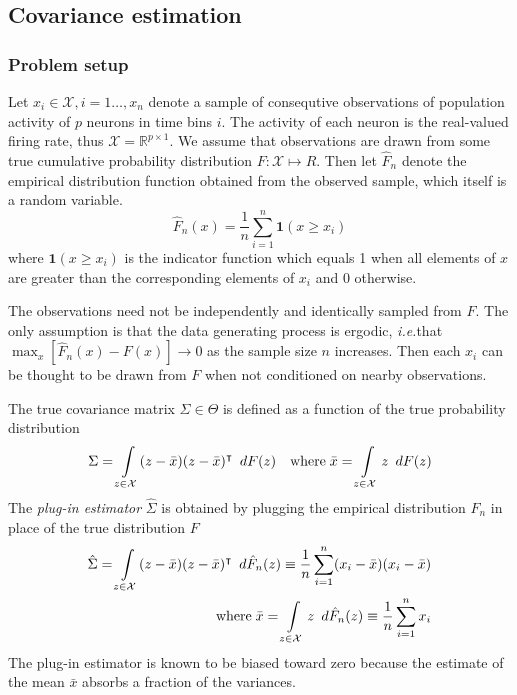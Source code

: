 \subsection{Covariance estimation}

\subsubsection{Problem setup}

Let $x_i \in \mathcal X, i=1\ldots,x_n$ denote a sample of consequtive observations of population activity of $p$ neurons in time bins $i$.  
The activity of each neuron is the real-valued firing rate, thus  $\mathcal X = \mathbb R^{p\times 1}$.  
We assume that observations are drawn from some true cumulative probability distribution $F: \mathcal X \mapsto R$. Then let $\hat F_n$ denote the empirical distribution function obtained from the observed sample, which itself is a random variable.
\begin{equation}
\hat F_n(x) = \frac 1 n \sum\limits_{i=1}^n \mathbf{1}(x \ge x_i)
\end{equation}
where $\mathbf 1(x \ge x_i)$ is the indicator function which equals 1 when all elements of $x$ are greater than the corresponding elements of $x_i$ and 0 otherwise.

The observations need not be independently and identically sampled from $F$. The only assumption is that the data generating process is ergodic, \emph{i.e.}\;that $\max_x \left[\hat F_n(x) - F(x)\right] \to 0$ as the sample size $n$ increases. Then each $x_i$ can be thought to be drawn from $F$ when not conditioned on nearby observations.

The true covariance matrix $\Sigma \in \Theta$ is defined as a function of the true probability distribution
\begin{equation}
\Sigma = \int\limits_{z\in\mathcal X} (z - \bar x)(z - \bar x)^\intercal \mathop{}\,d F(z)
\quad\mbox{where}\;
\bar x = \int\limits_{z\in\mathcal X} z \mathop{}\,d F(z)
\end{equation}
The \emph{plug-in estimator} $\hat\Sigma$ is obtained by plugging the empirical distribution $F_n$ in place of the true distribution $F$
\begin{equation}
\begin{split}
\hat\Sigma = \int\limits_{z\in\mathcal X} (z - \bar x)(z - \bar x)^\intercal \mathop{}\,d \hat F_n(z) 
\equiv \frac  1 n\sum\limits_{i=1}^n (x_i-\bar x)(x_i - \bar x)
\\
\mbox{where}\;\bar x = 
\int\limits_{z\in \mathcal X}z \mathop{}\,d \hat F_n(z) \equiv \frac 1 n\sum\limits_{i=1}^n x_i
\end{split}
\end{equation}
The plug-in estimator is known to be biased toward zero because the estimate of the mean $\bar x$ absorbs a fraction of the variances. 

